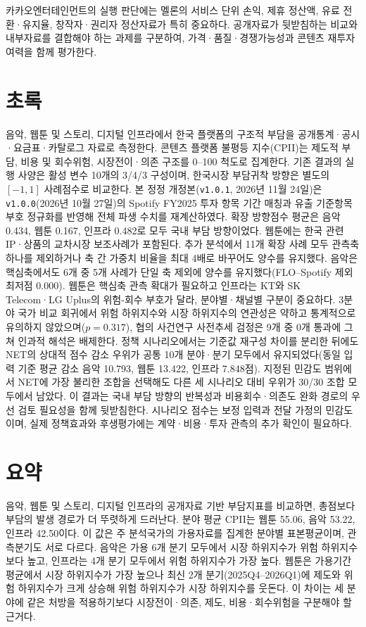 \documentclass[11pt,a4paper]{report}
\begin{document}
카카오엔터테인먼트의 실행 판단에는 멜론의 서비스 단위 손익, 제휴 정산액, 유료 전환·유지율, 창작자·권리자 정산자료가 특히 중요하다. 공개자료가 뒷받침하는 비교와 내부자료를 결합해야 하는 과제를 구분하여, 가격·품질·경쟁가능성과 콘텐츠 재투자 여력을 함께 평가한다.
\clearpage

\chapter*{초록}
음악, 웹툰 및 스토리, 디지털 인프라에서 한국 플랫폼의 구조적 부담을 공개통계·공시·요금표·카탈로그 자료로 측정한다. 콘텐츠 플랫폼 불평등 지수(CPII)는 제도적 부담, 비용 및 회수위험, 시장전이·의존 구조를 0--100 척도로 집계한다. 기존 결과의 실행 사양은 활성 변수 10개의 3/4/3 구성이며, 한국시장 부담귀착 방향은 별도의 \([-1,1]\) 사례점수로 비교한다. 본 정정 개정본(\texttt{v1.0.1}, 2026년 11월 24일)은 \texttt{v1.0.0}(2026년 10월 27일)의 Spotify FY2025 투자 항목 기간 매칭과 유출 기준항목 부호 정규화를 반영해 전체 파생 수치를 재계산하였다. 확장 방향점수 평균은 음악 0.434, 웹툰 0.167, 인프라 0.482로 모두 국내 부담 방향이었다. 웹툰에는 한국 관련 IP·상품의 교차시장 보조사례가 포함된다. 추가 분석에서 11개 확장 사례 모두 관측축 하나를 제외하거나 축 간 가중치 비율을 최대 4배로 바꾸어도 양수를 유지했다. 음악은 핵심축에서도 6개 중 5개 사례가 단일 축 제외에 양수를 유지했다(FLO--Spotify 제외 최저점 0.000). 웹툰은 핵심축 관측 확대가 필요하고 인프라는 KT와 SK Telecom·LG Uplus의 위험-회수 부호가 달라, 분야별·채널별 구분이 중요하다. 3분야 국가 비교 회귀에서 위험 하위지수와 시장 하위지수의 연관성은 약하고 통계적으로 유의하지 않았으며($p=0.317$), 협의 사건연구 사전추세 검정은 9개 중 0개 통과에 그쳐 인과적 해석은 배제한다. 정책 시나리오에서는 기준값 재구성 차이를 분리한 뒤에도 NET의 상대적 점수 감소 우위가 공통 10개 분야·분기 모두에서 유지되었다(동일 입력 기준 평균 감소 음악 10.793, 웹툰 13.422, 인프라 7.848점). 지정된 민감도 범위에서 NET에 가장 불리한 조합을 선택해도 다른 세 시나리오 대비 우위가 30/30 조합 모두에서 남았다. 이 결과는 국내 부담 방향의 반복성과 비용회수·의존도 완화 경로의 우선 검토 필요성을 함께 뒷받침한다. 시나리오 점수는 보정 입력과 전달 가정의 민감도이며, 실제 정책효과와 후생평가에는 계약·비용·투자 관측의 추가 확인이 필요하다.

\clearpage

\chapter*{요약}
음악, 웹툰 및 스토리, 디지털 인프라의 공개자료 기반 부담지표를 비교하면, 총점보다 부담의 발생 경로가 더 뚜렷하게 드러난다. 분야 평균 CPII는 웹툰 55.06, 음악 53.22, 인프라 42.50이다. 이 값은 주 분석국가의 가용자료를 집계한 분야별 표본평균이며, 관측분기도 서로 다르다. 음악은 가용 6개 분기 모두에서 시장 하위지수가 위험 하위지수보다 높고, 인프라는 4개 분기 모두에서 위험 하위지수가 가장 높다. 웹툰은 가용기간 평균에서 시장 하위지수가 가장 높으나 최신 2개 분기(2025Q4--2026Q1)에 제도와 위험 하위지수가 크게 상승해 위험 하위지수가 시장 하위지수를 웃돈다. 이 차이는 세 분야에 같은 처방을 적용하기보다 시장전이·의존, 제도, 비용·회수위험을 구분해야 할 근거다.
\end{document}
